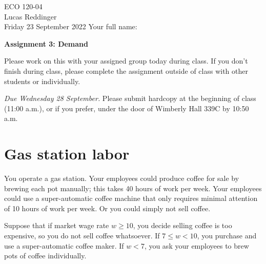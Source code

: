 \documentclass[
    letterpaper,paper=portrait,fleqn,
    DIV=16,fontsize=12pt,twoside=semi,
    parskip=full-,
    headings=standardclasses]
{scrartcl}
\begin{document}
\RaggedRight
\thispagestyle{plain}

ECO 120-04 \\
Lucas Reddinger \\
Friday 23 September 2022 \hfill Your full name: \underline{\hspace{3.25in}}

\vspace{0.7\baselineskip}
\textbf{\LARGE Assignment 3: Demand}
\vspace{0.3\baselineskip}

Please work on this with your assigned group today during class. If you don't finish during class, please complete the assignment outside of class with other students or individually.
 
\emph{Due Wednesday 28 September.} Please submit hardcopy at the beginning of class (11:00 a.m.), or if you prefer, under the door of Wimberly Hall 339C by 10:50 a.m.

\section*{Gas station labor}

You operate a gas station. Your employees could produce coffee for sale by brewing each pot manually; this takes 40 hours of work per week. Your employees could use a super-automatic coffee machine that only requires minimal attention of 10 hours of work per week. Or you could simply not sell coffee.

Suppose that if market wage rate $w\geq10$, you decide selling coffee is too expensive, so you do not sell coffee whatsoever. If $7 \leq w < 10$, you purchase and use a super-automatic coffee maker. If $w < 7$, you ask your employees to brew pots of coffee individually.
\end{document}
